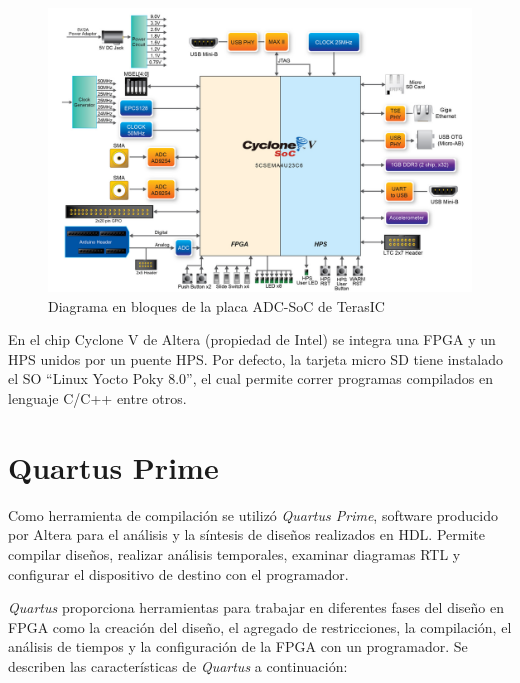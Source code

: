 \begin{figure}
\centering
\includegraphics[scale=0.25]{./Figures/ADC-SoC_blockdiagram.jpg}
\caption{Diagrama en bloques de la placa ADC-SoC de TerasIC}
\end{figure}


En el chip Cyclone V de Altera (propiedad de Intel) se integra una FPGA y un HPS unidos por un puente HPS. Por defecto, la tarjeta micro SD tiene instalado el SO “​Linux Yocto Poky 8.0​”, el cual permite correr programas compilados en lenguaje C/C++ entre otros.
 
 
\section{Quartus Prime}
Como herramienta de compilación se utilizó \textit{Quartus Prime}, software producido por Altera para el análisis y la síntesis de diseños realizados en HDL. Permite compilar diseños, realizar análisis temporales, examinar diagramas RTL y configurar el dispositivo de destino con el programador.

\textit{Quartus} proporciona herramientas para trabajar en diferentes fases del diseño en FPGA como la creación del diseño, el agregado de restricciones, la compilación, el análisis de tiempos y la configuración de la FPGA con un programador. Se describen las características de \textit{Quartus} a continuación:


